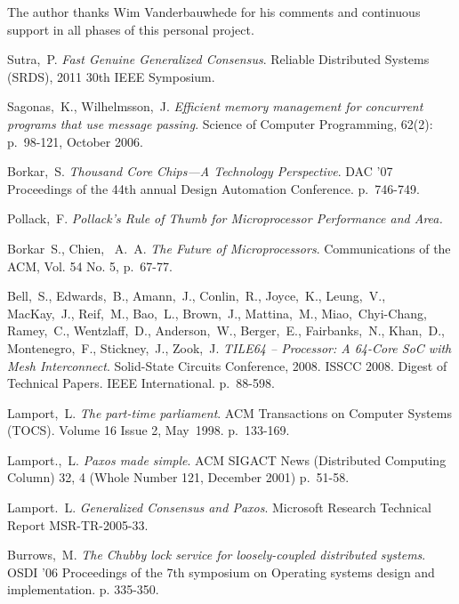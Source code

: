 \documentclass[english,11pt]{l4proj}
\begin{document}
The author thanks Wim Vanderbauwhede for his comments and continuous support in
all phases of this personal project.

\clearpage
\begin{thebibliography}{99}

     Sutra,~P. \emph{Fast Genuine Generalized Consensus}. Reliable
        Distributed Systems (SRDS), 2011 30th IEEE Symposium.

     Sagonas,~K., Wilhelmsson,~J. \emph{Efficient memory
        management for concurrent programs that use message passing}. Science of
        Computer Programming, 62(2): p.~98-121, October 2006.

     Borkar,~S. \emph{Thousand Core Chips—A Technology
        Perspective}. DAC '07 Proceedings of the 44th annual Design Automation
        Conference. p.~746-749.

     Pollack,~F. \emph{Pollack's Rule of Thumb for
        Microprocessor Performance and Area.}

     Borkar~S., Chien,~ A.~A. \emph{The Future
        of Microprocessors}. Communications of the ACM, Vol. 54 No. 5, p.~67-77.

     Bell,~S., Edwards,~B., Amann,~J., Conlin,~R.,
        Joyce,~K., Leung,~V., MacKay,~J., Reif,~M., Bao,~L., Brown,~J.,
        Mattina,~M., Miao,~Chyi-Chang, Ramey,~C., Wentzlaff,~D.,
        Anderson,~W., Berger,~E., Fairbanks,~N., Khan,~D., Montenegro,~F.,
        Stickney,~J., Zook,~J. \emph{TILE64 -- Processor: A 64-Core SoC with
        Mesh Interconnect}. Solid-State Circuits Conference, 2008. ISSCC 2008.
        Digest of Technical Papers. IEEE International. p.~88-598.

     Lamport,~L. \emph{The part-time parliament}. ACM
        Transactions on Computer Systems (TOCS). Volume 16 Issue 2, May~1998.
        p.~133-169.

     Lamport.,~L. \emph{Paxos made simple}. ACM SIGACT
        News (Distributed Computing Column) 32, 4 (Whole Number 121, December
        2001) p.~51-58.

     Lamport.~L. \emph{Generalized Consensus and
        Paxos}. Microsoft Research Technical Report MSR-TR-2005-33.

     Burrows,~M. \emph{The Chubby lock service for
        loosely-coupled distributed systems}. OSDI '06 Proceedings of the 7th
        symposium on Operating systems design and implementation. p. 335-350.


\end{thebibliography}
\end{document}
